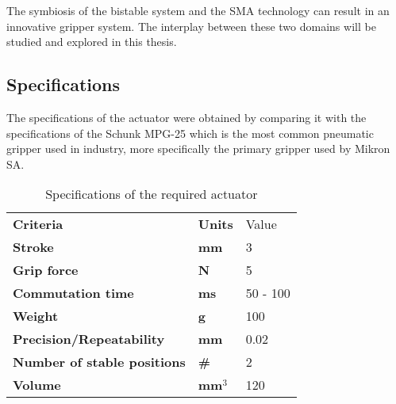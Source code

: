 The symbiosis of the bistable system and the SMA technology can result in an innovative gripper system. The interplay between these two domains will be studied and explored in this thesis.

\subsection{Specifications}\label{subsec:specifications}
The specifications of the actuator were obtained by comparing it with the specifications of the Schunk MPG-25 which is the most common pneumatic gripper used in industry, more specifically the primary gripper used by Mikron SA.

\begin{table}[H]%
  \centering
  \footnotesize
  \caption{Specifications of the required actuator}
  \label{tab:specs}
  \begin{tabu} to 0.5
      Criteria & Units & Value\\
      Stroke & mm & 3\\
      Grip force & N & 5\\
      Commutation time & ms & 50 - 100\\
      Weight & g & 100\\
      Precision/Repeatability & mm & 0.02\\
      Number of stable positions & \# & 2\\
      Volume & mm$^3$ & 120 \\
  \end{tabu}
\end{table}

